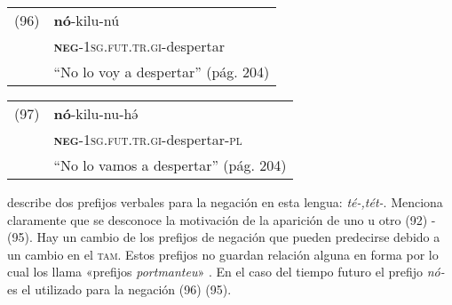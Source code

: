 {%
\begin{tabular}{ll}
(96) & \textbf{nó}-kilu-nú \\
& \textsc{\textbf{neg}-1sg.fut.tr.gi}-despertar \\
& ``No lo voy a despertar'' (pág. 204)
\end{tabular} \vspace{0.3cm}

\begin{tabular}{ll}
(97) & \textbf{nó}-kilu-nu-hə́ \\
& \textsc{\textbf{neg}-1sg.fut.tr.gi}-despertar-\textsc{pl} \\
& ``No lo vamos a despertar'' (pág. 204)
\end{tabular} \vspace{0.5cm}

}

\textcolor{MidnightBlue}{\citet{Tlahuica}} describe dos prefijos verbales para la negación en esta lengua: {\setmainfont{Charis SIL} \textit{té-,tét-}}. Menciona claramente que se desconoce la motivación de la aparición de uno u otro (92) - (95). Hay un cambio de los prefijos de negación que pueden predecirse debido a un cambio en el \textsc{tam}. Estos prefijos no guardan relación alguna en forma por lo cual los llama «prefijos \textit{portmanteu}» \textcolor{MidnightBlue}{\citep[pág. 200]{Tlahuica}}. En el caso del tiempo futuro el prefijo {\setmainfont{Charis SIL} \textit{nó-}} es el utilizado para la negación (96) (95).